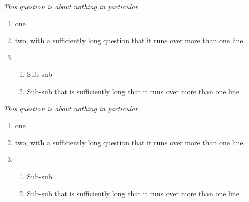 \documentclass{ouexam}
\begin{document}
\question
\emph{This question is about nothing in particular.}
\begin{enumerate}
\item one
\item two, with a sufficiently long question that it runs over more than one line.
\item 
\begin{enumerate}
\item Sub-sub
\item Sub-sub that is sufficiently long that it runs over more than one line.
\end{enumerate}
\end{enumerate}



\question
\emph{This question is about nothing in particular.}
\begin{enumerate}
\item one
\item two, with a sufficiently long question that it runs over more than one line.
\item 
\begin{enumerate}
\item Sub-sub
\item Sub-sub that is sufficiently long that it runs over more than one line.
\end{enumerate}
\end{enumerate}
\end{document}

